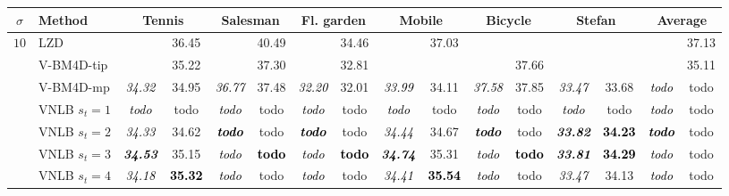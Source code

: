\documentclass[10pt, journal, twocolumn, final, a4paper]{IEEEtran}
\newcommand{\bsic}[1]{\textcolor{black}{\textit{#1}}}
\newcommand{\Bsic}[1]{\textcolor{black}{\textbf{\textit{#1}}}}
\newcommand{\Best}[1]{\textbf{\textcolor{black}{#1}}}
\begin{document}
\begin{table}[htp!]
	\begin{center}
		{\small
		\renewcommand{\tabcolsep}{1.6mm}
		\renewcommand{\arraystretch}{1.3}
		\begin{tabular}{ c | l |c c | c c | c c | c c | c c | c c | c c}
			\hline
			\rule{0pt}{6pt}$\sigma$ & Method             & \multicolumn{2}{c}{Tennis}  & \multicolumn{2}{c}{Salesman} &\multicolumn{2}{c}{Fl. garden}& \multicolumn{2}{c}{Mobile}  & \multicolumn{2}{c}{Bicycle}  & \multicolumn{2}{c|}{Stefan} & \multicolumn{2}{c}{Average} \\\hline
			\multirow{1}{*}{$10$}
			                      & LZD                  & \bsic{     } &       36.45  & \bsic{     } &       40.49   & \bsic{     } &       34.46   & \bsic{     } &       37.03  &              &               &              &              & \bsic{     } &       37.13  \\
			                      & V-BM4D-tip           & \bsic{     } &       35.22  & \bsic{     } &       37.30   & \bsic{     } &       32.81   &              &              &              &       37.66   &              &              & \bsic{     } &       35.11  \\
			                      & V-BM4D-mp            & \bsic{34.32} &       34.95  & \bsic{36.77} &       37.48   & \bsic{32.20} &       32.01   & \bsic{33.99} &       34.11  & \bsic{37.58} &       37.85   & \bsic{33.47} &       33.68  & \bsic{todo } &       todo   \\
			                      & VNLB   $s_t = 1$     & \bsic{todo } &       todo   & \bsic{todo } &       todo    & \bsic{todo } &       todo    & \bsic{todo } &       todo   & \bsic{todo } &       todo    & \bsic{todo } &       todo   & \bsic{todo } &       todo   \\
			                      & VNLB   $s_t = 2$     & \bsic{34.33} &       34.62  & \Bsic{todo } &       todo    & \Bsic{todo } &       todo    & \bsic{34.44} &       34.67  & \Bsic{todo } &       todo    & \Bsic{33.82} & \Best{34.23} & \Bsic{todo } &       todo   \\
			                      & VNLB   $s_t = 3$     & \Bsic{34.53} &       35.15  & \bsic{todo } & \Best{todo }  & \bsic{todo } & \Best{todo }  & \Bsic{34.74} &       35.31  & \bsic{todo } & \Best{todo }  & \Bsic{33.81} & \Best{34.29} & \bsic{todo } &       todo   \\
			                      & VNLB   $s_t = 4$     & \bsic{34.18} & \Best{35.32} & \bsic{todo } &       todo    & \bsic{todo } &       todo    & \bsic{34.41} & \Best{35.54} & \bsic{todo } &       todo    & \bsic{33.47} &       34.13  & \bsic{todo } &       todo   \\\hline

\end{tabular}}
\end{center}
\end{table}
\end{document}
